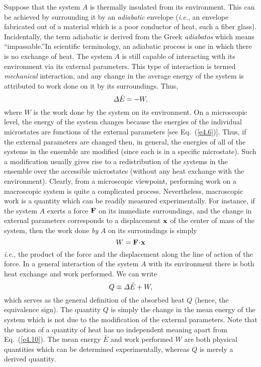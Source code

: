 Suppose that the system $A$ is thermally insulated from its environment. This can be
achieved by surrounding it by an {\em adiabatic}\/ envelope ({\em i.e.}, an envelope 
fabricated out of a material which is a poor conductor of heat, such a fiber glass).
Incidentally, the term adiabatic is derived from the Greek {\em adiabatos}\/ which
means ``impassable.''\@ In scientific terminology, an adiabatic process is one in
which there is no exchange of heat. The system $A$ is still capable of interacting
with its environment via its external parameters. This type of interaction is
termed {\em mechanical}\/ interaction, and any change in the average energy of the
system is attributed to work done on it by its surroundings. Thus,
\begin{equation}
{\mit\Delta} \bar{E} = -W,
\end{equation}
where $W$ is the work done by the system on its environment. On a microscopic level,
the energy of the 
system changes because the energies of the individual microstates are
functions of the external parameters [see Eq.~(\ref{e4.6})]. 
Thus, if the external parameters
are changed then, in general, the energies of all of the systems in the ensemble
are modified (since each is in a specific microstate). Such a modification 
 usually gives rise to a redistribution of the systems in the ensemble over the
accessible microstates  (without any heat
exchange with the environment). Clearly, from a microscopic viewpoint, performing
 work on
a macroscopic system is quite a complicated process. Nevertheless, macroscopic work
is a quantity which can be readily measured experimentally. For instance, if
the system $A$ exerts a force ${\bf F}$ on its immediate surroundings, and 
the change in external parameters corresponds to a displacement ${\bf x}$ 
of the center of mass of the system, then the work done {\em by}
$A$ on its surroundings
is simply
\begin{equation}
W =  {\bf F}\!\cdot \!{\bf x}
\end{equation}
{\em i.e.}, the product of the force and the displacement along the line of action
of the force.
In a general interaction of the system $A$ with its environment there is both
heat exchange and work performed. We can write
\begin{equation}
Q \equiv {\mit\Delta} \bar{E} + W,\label{e4.10}
\end{equation}
which serves as the general definition of the absorbed heat $Q$ (hence, the
equivalence sign). The quantity $Q$ is
simply the change in the mean energy of the system
which is not due to the modification of the
external parameters. Note that the notion of a quantity of heat has no independent
meaning apart from Eq.~(\ref{e4.10}). The mean energy $\bar{E}$ and work 
performed $W$ are
both physical quantities which can be determined experimentally, whereas 
$Q$ is merely a derived quantity.

